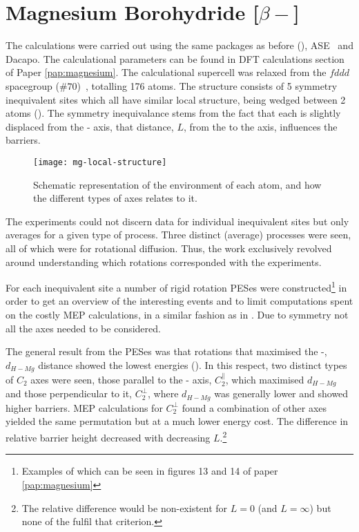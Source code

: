 \section{Magnesium Borohydride [$\beta-$]}
\label{sec:borohydrides-magnesium}
The calculations were carried out using the same packages as before (), ASE~\cite{ase-2002} and Dacapo\cite{dacapo-1999}.
The calculational parameters can be found in DFT calculations section of Paper \ref{pap:magnesium}.
The calculational supercell was relaxed from the $fddd$ spacegroup ($\#70$)~\cite{mgbh42-structure-fddd}, totalling 176 atoms.
The structure consists of 5 symmetry inequivalent  sites which all have similar local structure, being wedged between 2  atoms ().
The symmetry inequivalance stems from the fact that each  is slightly displaced from the - axis, that distance, $L$, from the  to the axis, influences the barriers.

\begin{figure}[htb]
\begin{minipage}{1.0\textwidth}
\begin{center}
    \texttt{[image: mg-local-structure]}
    \parbox{0.85\linewidth}{
\caption{
Schematic representation of the environment of each  atom, and how the different types of axes relates to it.
}
\label{fig:mg-local-structure}
}
\end{center}
\end{minipage}
\end{figure}

The experiments could not discern data for individual inequivalent sites but only averages for a given type of process.
Three distinct (average) processes were seen, all of which were for rotational diffusion.
Thus, the work exclusively revolved around understanding which rotations corresponded with the experiments.

For each inequivalent site a number of rigid rotation PESes were constructed\footnote{Examples of which can be seen in figures 13 and 14 of paper \ref{pap:magnesium}} in order to get an overview of the interesting events and to limit computations spent on the costly MEP calculations, in a similar fashion as in .
Due to symmetry not all the axes needed to be considered.

The general result from the PESes was that rotations that maximised the -, $d_{H-Mg}$ distance showed the lowest energies ().
In this respect, two distinct types of $C_2$ axes were seen, those parallel to the - axis, $C_2^\parallel$, which maximised $d_{H-Mg}$ and those perpendicular to it, $C_2^\perp$, where $d_{H-Mg}$ was generally lower and showed higher barriers.
MEP calculations for $C_2^\perp$ found a combination of other axes yielded the same permutation but at a much lower energy cost.
The difference in relative barrier height decreased with decreasing $L$.\footnote{The relative difference would be non-existent for $L=0$ (and $L=\infty$) but none of the  fulfil that criterion.}

